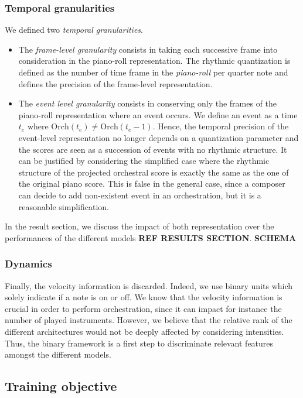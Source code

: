 \documentclass{article}
\begin{document}
\subsubsection{Temporal granularities}
We defined two \textit{temporal granularities}.
\begin{itemize}
\item The \textit{frame-level granularity} consists in taking each successive frame into consideration in the piano-roll representation. The rhythmic quantization is defined as the number of time frame in the \textit{piano-roll} per quarter note and defines the precision of the frame-level representation.
\item The \textit{event level granularity} consists in conserving only the frames of the piano-roll representation where an event occurs. We define an event as a time $t_{e}$ where $\text{Orch}(t_{e}) \neq \text{Orch}(t_{e} - 1)$.  
Hence, the temporal precision of the event-level representation no longer depends on a quantization parameter and the scores are seen as a succession of events with no rhythmic structure.
It can be justified by considering the simplified case where the rhythmic structure of the projected orchestral score is exactly the same as the one of the original piano score. 
This is false in the general case, since a composer can decide to add non-existent event in an orchestration, but it is a reasonable simplification.
\end{itemize}
In the result section, we discuss the impact of both representation over the performances of the different models \textbf{REF RESULTS SECTION}.
\textbf{SCHEMA}

\subsubsection{Dynamics}
Finally, the velocity information is discarded. Indeed, we use binary units which solely indicate if a note is on or off. We know that the velocity information is crucial in order to perform orchestration, since it can impact for instance the number of played instruments. However, we believe that the relative rank of the different architectures would not be deeply affected by considering intensities. Thus, the binary framework is a first step to discriminate relevant features amongst the different models.

\subsection{Training objective}
\end{document}
